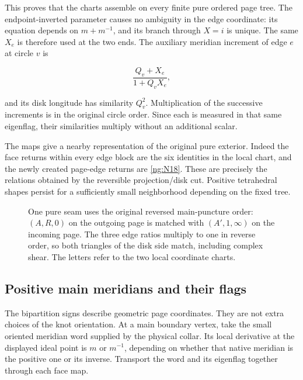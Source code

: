 This proves that the charts assemble on every finite pure ordered
page tree. The endpoint-inverted parameter causes no ambiguity in
the edge coordinate: its equation depends on \(m+m^{-1}\), and its
branch through \(X=i\) is unique. The same \(X_e\) is therefore
used at the two ends. The auxiliary meridian increment of edge
\(e\) at circle \(v\) is

\begin{equation}\label{ng:S5}
\frac{Q_v+X_e}{1+Q_vX_e},
\end{equation}

and its disk longitude has similarity \(Q_v^2\).
Multiplication of the successive increments is in the original
circle order. Since each is measured in that same eigenflag,
their similarities multiply without an additional scalar.

The maps give a nearby representation of the original
pure exterior. Indeed the face returns within every edge block
are the six identities in the local chart, and the newly created
page-edge returns are \eqref{ng:N18}. These are precisely the relations
obtained by the reversible projection/disk cut. Positive
tetrahedral shapes persist for a sufficiently small neighborhood
depending on the fixed tree.

\begin{figure}[ht]
\centering
\caption{One pure seam uses the original reversed main-puncture order:
$(A,R,0)$ on the outgoing page is matched with $(A',1,\infty)$
on the incoming page. The three edge ratios multiply to one in
reverse order, so both triangles of the disk side match, including
complex shear. The letters refer to the two local coordinate charts.}
\label{ng:seam-figure}
\end{figure}

\subsection{Positive main meridians and their flags}\label{ng:positive-main-meridians-and-their-flags}

The bipartition signs describe geometric page coordinates. They are
not extra choices of the knot orientation. At a main boundary
vertex, take the small oriented meridian word supplied by
the physical collar. Its local derivative at the displayed ideal
point is \(m\) or \(m^{-1}\), depending on whether that native
meridian is the positive one or its inverse. Transport the word
and its eigenflag together through each face map.


